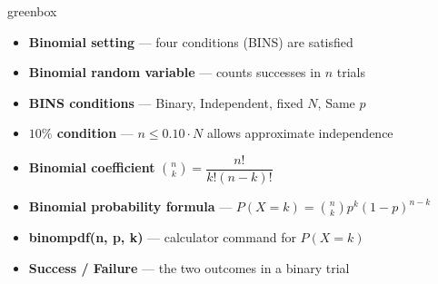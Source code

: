 \documentclass[10pt]{article}
\begin{document}
\begin{skillbox}{greenbox}
\begin{minipage}[t]{0.48\linewidth}
    \begin{itemize}
        \item \textbf{Binomial setting} --- four conditions (BINS) are satisfied
        \item \textbf{Binomial random variable} --- counts successes in $n$ trials
        \item \textbf{BINS conditions} --- Binary, Independent, fixed $N$, Same $p$
        \item \textbf{$10\%$ condition} --- $n \le 0.10 \cdot N$ allows approximate
              independence
    \end{itemize}
\end{minipage}
\hfill
\begin{minipage}[t]{0.48\linewidth}
    \begin{itemize}
        \item \textbf{Binomial coefficient} $\binom{n}{k} = \dfrac{n!}{k!(n-k)!}$
        \item \textbf{Binomial probability formula} ---
              $P(X=k) = \binom{n}{k} p^k (1-p)^{n-k}$
        \item \textbf{binompdf(n, p, k)} --- calculator command for $P(X = k)$
        \item \textbf{Success / Failure} --- the two outcomes in a binary trial
    \end{itemize}
\end{minipage}
\end{skillbox}
\end{document}
